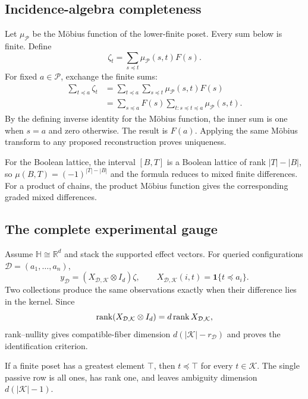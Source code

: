 \subsection{Incidence-algebra completeness}

Let $\mu_{\mathcal P}$ be the M\"obius function of the lower-finite poset.
Every sum below is finite.  Define
\[
\zeta_t=\sum_{s\preceq t}\mu_{\mathcal P}(s,t)F(s).
\]
For fixed $a\in\mathcal P$, exchange the finite sums:
\begin{align*}
\sum_{t\preceq a}\zeta_t
&=\sum_{t\preceq a}\sum_{s\preceq t}
\mu_{\mathcal P}(s,t)F(s)\\
&=\sum_{s\preceq a}F(s)
\sum_{t:s\preceq t\preceq a}\mu_{\mathcal P}(s,t).
\end{align*}
By the defining inverse identity for the M\"obius function, the inner sum is
one when $s=a$ and zero otherwise.  The result is $F(a)$.  Applying the same
M\"obius transform to any proposed reconstruction proves uniqueness.

For the Boolean lattice, the interval $[B,T]$ is a Boolean lattice of rank
$|T|-|B|$, so $\mu(B,T)=(-1)^{|T|-|B|}$ and the formula reduces to mixed
finite differences.  For a product of chains, the product M\"obius function
gives the corresponding graded mixed differences.

\subsection{The complete experimental gauge}

Assume $\mathbb H\cong\mathbb R^d$ and stack the supported effect vectors.
For queried configurations $\mathcal D=(a_1,\ldots,a_n)$,
\begin{equation}
y_{\mathcal D}
=(X_{\mathcal D,\mathcal K}\otimes I_d)\zeta,
\qquad
X_{\mathcal D,\mathcal K}(i,t)=\mathbf1\{t\preceq a_i\}.
\label{eq:appendix-mask-linear-system}
\end{equation}
Two collections produce the same observations exactly when their difference
lies in the kernel.  Since
\[
\operatorname{rank}(X_{\mathcal D,\mathcal K}\otimes I_d)
=d\operatorname{rank} X_{\mathcal D,\mathcal K},
\]
rank--nullity gives compatible-fiber dimension
$d(|\mathcal K|-r_{\mathcal D})$ and proves the identification criterion.

If a finite poset has a greatest element $\top$, then $t\preceq\top$ for every
$t\in\mathcal K$.  The single passive row is all ones, has rank one, and
leaves ambiguity dimension $d(|\mathcal K|-1)$.

